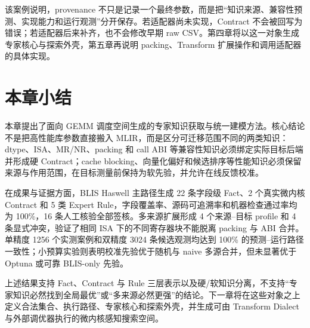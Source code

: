 该案例说明，provenance 不只是记录一个最终参数，而是把“知识来源、兼容性预测、实现能力和运行观测”分开保存。若适配器尚未实现，Contract 不会被回写为错误；若适配器后来补齐，也不会修改早期 raw CSV。第四章将以这一对象生成专家核心与探索外壳，第五章再说明 packing、Transform 扩展操作和调用适配器的具体实现。

\section{本章小结}

本章提出了面向 GEMM 调度空间生成的专家知识获取与统一建模方法。核心结论不是把高性能库参数直接搬入 MLIR，而是区分可迁移范围不同的两类知识：dtype、ISA、MR/NR、packing 和 call ABI 等兼容性知识必须绑定实际目标后端并形成硬 Contract；cache blocking、向量化偏好和候选排序等性能知识必须保留来源与作用范围，在目标测量前保持为软先验，并允许在线反馈校准。

在成果与证据方面，BLIS Haswell 主路径生成 22 条字段级 Fact、2 个真实微内核 Contract 和 5 类 Expert Rule，字段覆盖率、源码可追溯率和机器检查通过率均为 100\%，16 条人工核验全部签核。多来源扩展形成 4 个来源--目标 profile 和 4 条显式冲突，验证了相同 ISA 下的不同寄存器块不能脱离 packing 与 ABI 合并。单精度 1256 个实测案例和双精度 3024 条候选观测均达到 100\% 的预测--运行路径一致性；小预算实验则表明校准先验优于随机与 naive 多源合并，但未显著优于 Optuna 或可靠 BLIS-only 先验。

上述结果支持 Fact、Contract 与 Rule 三层表示以及硬/软知识分离，不支持“专家知识必然找到全局最优”或“多来源必然更强”的结论。下一章将在这些对象之上定义合法集合、执行路径、专家核心和探索外壳，并生成可由 Transform Dialect 与外部调优器执行的微内核感知搜索空间。
